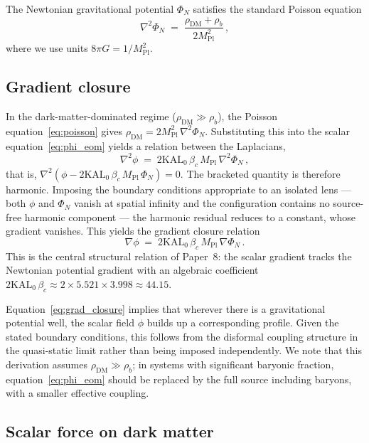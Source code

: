 \documentclass[12pt,a4paper]{article}
\newcommand{\KAL}{\mathrm{KAL}_0}
\newcommand{\Mpl}{M_{\mathrm{Pl}}}
\newcommand{\bc}{\beta_c}
\begin{document}
The Newtonian gravitational potential $\Phi_N$ satisfies the standard
Poisson equation
\begin{equation}
  \nabla^2\Phi_N \;=\; \frac{\rho_{\mathrm{DM}} + \rho_b}{2\Mpl^2}\,,
  \label{eq:poisson}
\end{equation}
where we use units $8\pi G = 1/\Mpl^2$.

\subsection{Gradient closure}

In the dark-matter-dominated regime ($\rho_{\mathrm{DM}} \gg \rho_b$),
the Poisson equation~\eqref{eq:poisson} gives
$\rho_{\mathrm{DM}} = 2\Mpl^2\,\nabla^2\Phi_N$. Substituting this into the
scalar equation~\eqref{eq:phi_eom} yields a relation between the Laplacians,
\begin{equation}
  \nabla^2\phi \;=\; 2\KAL\,\bc\,\Mpl\,\nabla^2\Phi_N\,,
  \label{eq:laplace_closure}
\end{equation}
that is, $\nabla^2\!\left(\phi - 2\KAL\,\bc\,\Mpl\,\Phi_N\right) = 0$.
The bracketed quantity is therefore harmonic. Imposing the boundary conditions
appropriate to an isolated lens --- both $\phi$ and $\Phi_N$ vanish at spatial
infinity and the configuration contains no source-free harmonic component ---
the harmonic residual reduces to a constant, whose gradient vanishes. This
yields the gradient closure relation
\begin{equation}
  \boxed{\nabla\phi \;=\; 2\KAL\,\bc\,\Mpl\,\nabla\Phi_N\,.}
  \label{eq:grad_closure}
\end{equation}
This is the central structural relation of Paper~8: the scalar gradient
tracks the Newtonian potential gradient with an algebraic coefficient
$2\KAL\,\bc \approx 2\times5.521\times3.998 \approx 44.15$.

Equation~\eqref{eq:grad_closure} implies that wherever there is a gravitational
potential well, the scalar field $\phi$ builds up a corresponding profile.
Given the stated boundary conditions, this follows from the disformal coupling
structure in the quasi-static limit rather than being imposed independently.
We note that this derivation assumes $\rho_{\mathrm{DM}} \gg \rho_b$; in
systems with significant baryonic fraction, equation~\eqref{eq:phi_eom}
should be replaced by the full source including baryons, with a smaller
effective coupling.

\subsection{Scalar force on dark matter}
\end{document}
